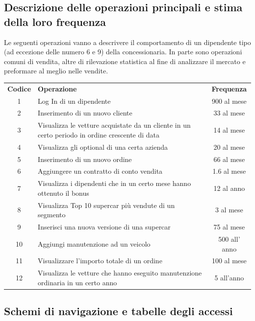 \documentclass[11pt]{article}
\begin{document}
\newpage

\subsection{Descrizione delle operazioni principali e stima della loro frequenza}

Le seguenti operazioni vanno a descrivere il comportamento di un dipendente tipo
(ad eccezione delle numero 6 e 9) della concessionaria. In parte sono operazioni
comuni di vendita, altre di rilevazione statistica al fine di analizzare il
mercato e preformare al meglio nelle vendite. 

\begin{table}[htbp]
    \centering
    \small
    \begin{tabularx}{\linewidth}{c X c}
      \rowcolor{red!20!}
      \textbf{Codice} & \textbf{Operazione} & \textbf{Frequenza} \\
      1 & Log In di un dipendente & 900 al mese \\
      2 & Inserimento di un nuovo cliente & 33 al mese \\
      3 & Visualizza le vetture acquistate da un cliente in un certo periodo in
      ordine crescente di data & 14 al mese \\
      4 & Visualizza gli optional di una certa azienda & 20 al mese \\
      5 & Inserimento di un nuovo ordine & 66 al mese \\
      6 & Aggiungere un contratto di conto vendita & 1.6 al mese \\
      7 & Visualizza i dipendenti che in un certo mese hanno ottenuto il bonus & 12
      al anno \\
      8 & Visualizza Top 10 supercar più vendute di un segmento & 3 al mese \\
      9 & Inserisci una nuova versione di una supercar & 75 al mese \\
      10 & Aggiungi manutenzione ad un veicolo & 500 all' anno \\
      11 & Visualizzare l'importo totale di un ordine & 100 al mese \\
      12 & Visualizza le vetture che hanno eseguito manutenzione ordinaria in un
      certo anno & 5 all'anno \\
    \end{tabularx}
    \label{tab:tabella_frequenze}
\end{table}
\subsection{Schemi di navigazione e tabelle degli accessi}
\end{document}
